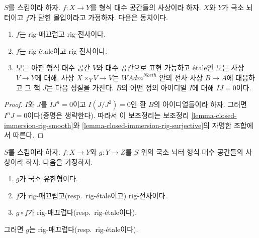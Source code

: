 \begin{lemma}
\label{lemma-closed-immersion-rig-smooth-rig-surjective}
$S$를 스킴이라 하자. $f : X \to Y$를 형식 대수 공간들의 사상이라 하자.
$X$와 $Y$가 국소 뇌터이고 $f$가 닫힌 몰입이라고 가정하자. 다음은 동치이다.
\begin{enumerate}
\item $f$는 rig-매끄럽고 rig-전사이다.
\item $f$는 rig-\'etale이고 rig-전사이다.
\item 모든 아핀 형식 대수 공간 $V$와 대수 공간으로 표현 가능하고
\'etale인 모든 사상 $V \to Y$에 대해, 사상 $X \times_Y V \to V$는
$\textit{WAdm}^{Noeth}$ 안의 전사 사상 $B \to A$에 대응하고 그 핵 $J$는
다음 성질을 가진다. $B$의 어떤 정의 아이디얼 $I$에 대해 $IJ = 0$이다.
\end{enumerate}
\end{lemma}

\begin{proof}
$I$와 $J$를 $IJ^n = 0$이고 $I(J/J^2) = 0$인 환 $B$의 아이디얼들이라
하자. 그러면 $I^nJ = 0$이다(증명은 생략한다). 따라서 이 보조정리는
보조정리 \ref{lemma-closed-immersion-rig-smooth}와
\ref{lemma-closed-immersion-rig-surjective}의 자명한 조합에서 따른다.
\end{proof}

\begin{lemma}
\label{lemma-rig-etale-descent}
$S$를 스킴이라 하자. $f : X \to Y$와 $g : Y \to Z$를 $S$ 위의
국소 뇌터 형식 대수 공간들의 사상이라 하자. 다음을 가정하자.
\begin{enumerate}
\item $g$가 국소 유한형이다.
\item $f$가 rig-매끄럽고(resp.\ rig-\'etale이고) rig-전사이다.
\item $g \circ f$가 rig-매끄럽다(resp.\ rig-\'etale이다).
\end{enumerate}
그러면 $g$는 rig-매끄럽다(resp.\ rig-\'etale이다).
\end{lemma}

